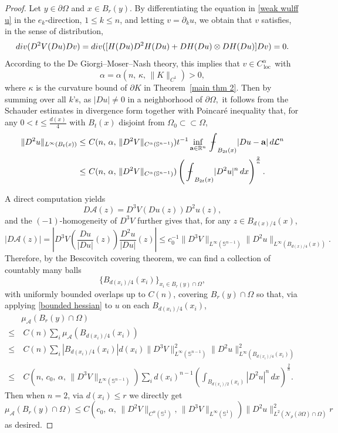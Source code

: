 \documentclass[10pt,a4paper]{amsart}
\def\az{\alpha}
\def\bint{{\ifinner\rlap{\bf\kern.35em--}
\int\else\rlap{\bf\kern.45em--}\int\fi}\ignorespaces}
\def\loc{{\mathop\mathrm{\,loc\,}}}
\begin{document}
\begin{proof}
    Let $y\in \partial\Omega$ and $x\in B_{r}(y)$.
    By differentiating the equation in \eqref{weak wulff u} in the $e_k$-direction, $1\le k\le n$, and letting $v=\partial_k u$, we obtain that $v$ satisfies, in the sense of distribution, 
    $${\rm div} (D^2V(Du) Dv)={\rm div}([H(Du)D^2H(Du)+DH(Du)\otimes DH(Du)]Dv )=0.$$
    According to the De Giorgi--Moser--Nash theory, this implies that $v\in C_\loc^{\alpha}$ with
    $$\alpha=\az(n,\,\kappa,\,\|K\|_{C^1})>0,$$
    where $\kappa$ is the curvature bound of $\partial K$ in Theorem~\ref{main thm 2}. 
    Then by summing over all $k$'s, as $|Du|\neq 0$ in a neighborhood of $\partial \Omega,$ it follows from the Schauder estimates in divergence form together with Poincar\'e inequality that, for any  $0<t\le \frac{d(x)} 4$ with $B_t(x)$ disjoint from $\Omega_0\subset\subset\Omega$, 
    \begin{align}
        \|D^2u\|_{L^\infty(B_t(x))}\le &\ C(n,\,\az,\,\|D^2V\|_{C^\az(\mathbb S^{n-1})})t^{-1} \inf_{{\bf a}\in\mathbb R^n}\bint_{B_{2t}(x)}|Du-{\bf a}|\,d\mathcal L^n\nonumber\\
        \le & \ C(n,\,\az,\,\|D^2V\|_{C^\az(\mathbb S^{n-1})}) \left(\bint_{B_{2t}(x)} |D^2 u|^n\, dx\right)^{\frac 2 n}. \label{bounded hessian}
    \end{align} 

    A direct computation yields
    $$D\mathcal A(z)= D^3V(Du(z))D^2u(z), $$
    and the $(-1)$-homogeneity of $D^3V$ further gives that,  for any $z\in B_{ {d(x)} /4}(x)$, 
    $$|D\mathcal A(z)|= \left|D^3V\left(\frac{Du}{|Du|}(z)\right)\frac{D^2u}{|Du|}(z)\right|\le c_0^{-1}\|D^3V\|_{L^\infty(\mathbb S^{n-1})}\|D^2u\|_{L^\infty(B_{ {d(x)} /4}(x))}.$$
    Therefore, by the Bescovitch covering theorem, we can find a collection of countably many balls 
    $$\{B_{d(x_i)/4}(x_i)\}_{x_i\in B_r(y)\cap \Omega},$$
    with uniformly bounded overlaps up to $C(n)$, covering $B_r(y)\cap \Omega$ so that,  via applying \eqref{bounded hessian} to $u$ on each $B_{d(x_i)/4}(x_i)$, 
\begin{align}
    & \mu_\mathcal A({B_r(y)\cap \Omega})\nonumber\\
    \le& \ C(n)\sum_{i} \mu_\mathcal A(B_{d(x_i)/4}(x_i))\nonumber\\
    \le & \ C(n)\sum_{i} |B_{d(x_i)/4}(x_i)| d(x_i) \|D^3V\|^2_{L^\infty(\mathbb S^{n-1})}\|D^2u\|^2_{L^\infty(B_{d(x_i)/4}(x_i))}\nonumber\\
    \le & \ C(n,\,c_0,\,\az,\, \|D^3V\|_{L^\infty(\mathbb S^{n-1})}) \sum_i  d(x_i)^{n-1} \left(\int_{B_{d(x_i)/2}(x_i)} |D^2 u|^n\, dx\right)^{\frac 2 n}.\label{mu estimate}
\end{align}
Then when $n=2$, via $d(x_i)\le r$ we directly get 
$$ \mu_\mathcal A({B_r(y)\cap \Omega})\le  C(c_0,\,\az,\,\|D^2V\|_{C^\az(\mathbb S^{1})},\,\|D^3V\|_{L^\infty(\mathbb S^{1})}) \| D^2 u\|^{2}_{L^2(\mathcal N_\rho(\partial \Omega)\cap \Omega)}r$$
as desired. 


\end{proof}
\end{document}
